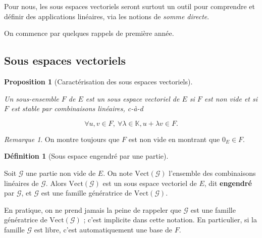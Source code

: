 \documentclass[
  french,
  letterpaper,
  DIV=11,
  numbers=noendperiod]{scrreprt}
\theoremstyle{plain}
\theoremstyle{definition}
\newtheorem{definition}{Définition}[chapter]
\theoremstyle{plain}
\newtheorem{proposition}{Proposition}[chapter]
\theoremstyle{plain}
\theoremstyle{definition}
\theoremstyle{definition}
\theoremstyle{plain}
\theoremstyle{remark}
\newtheorem{refremark}{Remarque}[chapter]
\newcounter{quartocallouttipno}
\newcommand{\quartocallouttip}[1]{\refstepcounter{quartocallouttipno}\label{#1}}
\begin{document}
Pour nous, les sous espaces vectoriels seront surtout un outil pour
comprendre et définir des applications linéaires, via les notions de
\emph{somme directe}.

On commence par quelques rappels de première année.

\subsection{Sous espaces vectoriels}\label{sous-espaces-vectoriels}

\begin{proposition}[Caractérisation des sous espaces
vectoriels]\protect\hypertarget{prp-caractérisation}{}\label{prp-caractérisation}

Un sous-ensemble \(F\) de \(E\) est un sous espace vectoriel de \(E\) si
\(F\) est non vide et si \(F\) est stable par combinaisons linéaires,
c-à-d

\[
    \forall u,v \in F,\ \forall \lambda \in \mathbb{K}, u+\lambda v \in F.
\]

\end{proposition}

\begin{refremark}
On montre toujours que \(F\) est non vide en montrant que
\(0_{E}\in F\).

\label{rem-non-vide}

\end{refremark}

\begin{definition}[Sous espace engendré par une
partie]\protect\hypertarget{def-sous-espace-engendre}{}\label{def-sous-espace-engendre}

Soit \(\mathcal{G}\) une partie non vide de \(E\). On note
\(\mathrm{Vect}(\mathcal{G})\) l'ensemble des combinaisons linéaires de
\(\mathcal{G}\). Alors \(\mathrm{Vect}(\mathcal{G})\) est un sous espace
vectoriel de \(E\), dit \textbf{engendré} par \(\mathcal{G}\), et
\(\mathcal{G}\) est une famille génératrice de
\(\mathrm{Vect}(\mathcal{G})\).

\end{definition}

\begin{tcolorbox}[enhanced jigsaw, arc=.35mm, bottomrule=.15mm, bottomtitle=1mm, breakable, colback=white, colbacktitle=quarto-callout-tip-color!10!white, colframe=quarto-callout-tip-color-frame, coltitle=black, left=2mm, leftrule=.75mm, opacityback=0, opacitybacktitle=0.6, rightrule=.15mm, title=\textcolor{quarto-callout-tip-color}{\faLightbulb}\hspace{0.5em}{Astuce \ref*{tip-sous-espace-engendre}}, titlerule=0mm, toprule=.15mm, toptitle=1mm]

\quartocallouttip{tip-sous-espace-engendre} 

En pratique, on ne prend jamais la peine de rappeler que \(\mathcal{G}\)
est une famille génératrice de \(\mathrm{Vect}(\mathcal{G})\) ; c'est
implicite dans cette notation. En particulier, si la famille
\(\mathcal{G}\) est libre, c'est automatiquement une base de \(F\).

\end{tcolorbox}
\end{document}

